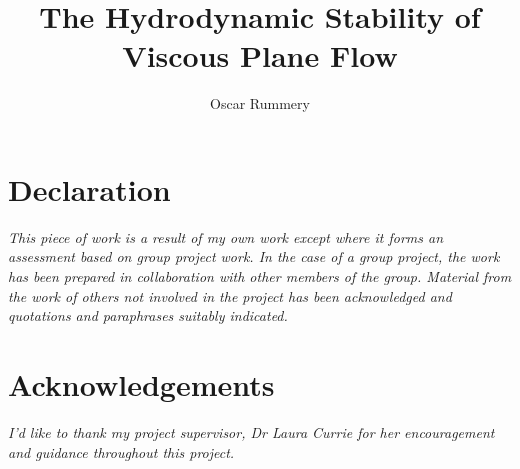 \documentclass[oneside, 11pt]{book} %
\title{The Hydrodynamic Stability of Viscous Plane Flow}
\author{Oscar Rummery}
\begin{document}
\frontmatter

\maketitle

\newpage

\section*{\centering Declaration}
\begin{center}
    \emph{This piece of work is a result of my own work except where it forms an assessment based on group project work. In the case of a group project, the work has been prepared in collaboration with other members of the group. Material from the work of others not involved in the project has been acknowledged and quotations and paraphrases suitably indicated.}
\end{center}

\section*{\centering Acknowledgements}
\begin{center}
    \emph{I'd like to thank my project supervisor, Dr Laura Currie for her encouragement and guidance throughout this project.}
\end{center}

\newpage

\tableofcontents

\newpage

\mainmatter





% 

% 









\appendix




\end{document}
